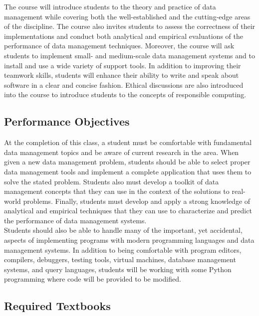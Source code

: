 \documentclass[11pt]{article} %
\begin{document}
\noindent The course will introduce students to the theory and practice of data management while covering both the well-established and the cutting-edge areas of the discipline.  The course also invites students to assess the correctness of their implementations and conduct both analytical and empirical evaluations of the performance of data
management techniques.  Moreover, the course will ask students to implement small- and medium-scale data management systems and to install and use a wide variety of support tools. In addition to improving their teamwork skills, students will enhance their ability to write and speak about software in a clear and concise fashion. Ethical discussions are also introduced into the course to introduce students to the concepts of responsible computing. 


\subsection*{Performance Objectives}

At the completion of this class, a student must be comfortable with fundamental data management topics and be aware of current research in the area.  When given a new data management problem, students should be able to select proper data management tools and implement a complete application that uses them to solve the stated problem.  Students also must develop a toolkit of data management concepts that they can use in the context of the solutions to real-world problems. Finally, students must develop and apply a strong knowledge of analytical and empirical techniques that they can use to characterize and predict the performance of data management systems.\\

\noindent Students should also be able to handle many of the important, yet accidental, aspects of implementing programs with modern programming languages and data management systems.  In addition to being comfortable with program editors, compilers, debuggers, testing tools, virtual machines, database management systems, and query languages, students will be working with some Python programming where code will be provided to be modified.


\subsection*{Required Textbooks}
\end{document}
